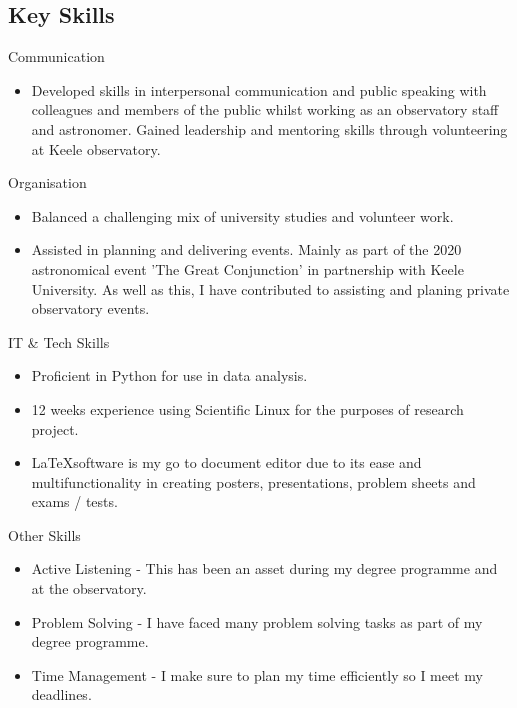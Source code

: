 \documentclass[a4paper, oneside, final]{scrartcl} %
\begin{document}
\begin{center}

\section{Key Skills}

Communication

\begin{itemize}
	\item Developed skills in interpersonal communication and public speaking with colleagues and members of the public whilst working as an observatory staff and astronomer. Gained leadership and mentoring skills through volunteering at Keele observatory.
\end{itemize}

Organisation

\begin{itemize}
	\item Balanced a challenging mix of university studies and volunteer work.
	\item Assisted in planning and delivering events. Mainly as part of the 2020 astronomical event 'The Great Conjunction' in partnership with Keele University. As well as this, I have contributed to assisting and planing private observatory events.
\end{itemize}

IT \& Tech Skills

\begin{itemize}
	\item Proficient in Python for use in data analysis.
	\item 12 weeks experience using Scientific Linux for the purposes of research project.
	\item \LaTeX \space software is my go to document editor due to its ease and multifunctionality in creating posters, presentations, problem sheets and exams / tests.
\end{itemize}

Other Skills

\begin{itemize}
	\item Active Listening - This has been an asset during my degree programme and at the observatory.
	\item Problem Solving - I have faced many problem solving tasks as part of my degree programme.
	\item Time Management - I make sure to plan my time efficiently so I meet my deadlines.
\end{itemize}


\end{center}
\end{document}

